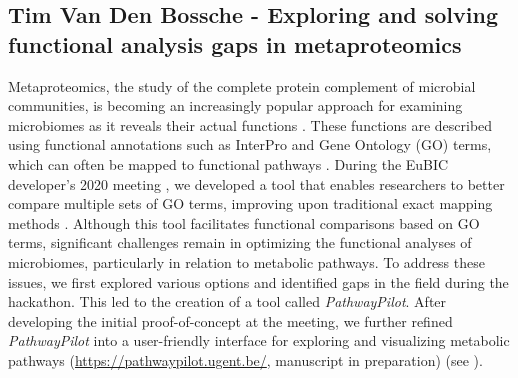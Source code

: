 \subsection{Tim Van Den Bossche - Exploring and solving functional analysis gaps in metaproteomics}

Metaproteomics, the study of the complete protein complement of microbial communities, is becoming an increasingly popular approach for examining microbiomes as it reveals their actual functions \citep{VanDenBossche2021}. These functions are described using functional annotations such as InterPro and Gene Ontology (GO) terms, which can often be mapped to functional pathways \citep{Schiebenhoefer2019}. During the EuBIC developer's 2020 meeting \citep{EuBIC-MS2020}, we developed a tool that enables researchers to better compare multiple sets of GO terms, improving upon traditional exact mapping methods \citep{Verschaffelt2021}. Although this tool facilitates functional comparisons based on GO terms, significant challenges remain in optimizing the functional analyses of microbiomes, particularly in relation to metabolic pathways. To address these issues, we first explored various options and identified gaps in the field during the hackathon. This led to the creation of a tool called \emph{PathwayPilot}. After developing the initial proof-of-concept at the meeting, we further refined \emph{PathwayPilot} into a user-friendly interface for exploring and visualizing metabolic pathways (\url{https://pathwaypilot.ugent.be/}, manuscript in preparation) (see \citep{issue7}).

